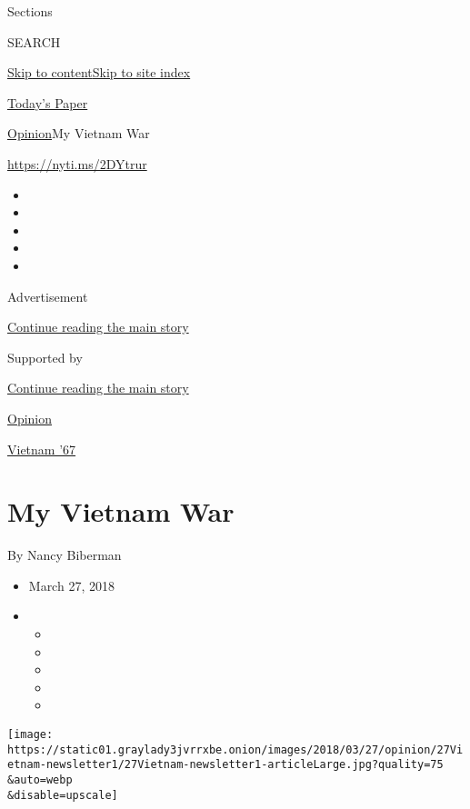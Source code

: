 Sections

SEARCH

\protect\hyperlink{site-content}{Skip to
content}\protect\hyperlink{site-index}{Skip to site index}

\href{https://myaccount.nytimes3xbfgragh.onion/auth/login?response_type=cookie\&client_id=vi}{}

\href{https://www.nytimes3xbfgragh.onion/section/todayspaper}{Today's
Paper}

\href{/section/opinion}{Opinion}\textbar{}My Vietnam War

\url{https://nyti.ms/2DYtrur}

\begin{itemize}
\item
\item
\item
\item
\item
\end{itemize}

Advertisement

\protect\hyperlink{after-top}{Continue reading the main story}

Supported by

\protect\hyperlink{after-sponsor}{Continue reading the main story}

\href{/section/opinion}{Opinion}

\href{/column/vietnam-67}{Vietnam '67}

\hypertarget{my-vietnam-war}{%
\section{My Vietnam War}\label{my-vietnam-war}}

By Nancy Biberman

\begin{itemize}
\item
  March 27, 2018
\item
  \begin{itemize}
  \item
  \item
  \item
  \item
  \item
  \end{itemize}
\end{itemize}

\texttt{[image: https://static01.graylady3jvrrxbe.onion/images/2018/03/27/opinion/27Vietnam-newsletter1/27Vietnam-newsletter1-articleLarge.jpg?quality=75\\\&auto=webp\\\&disable=upscale]}

